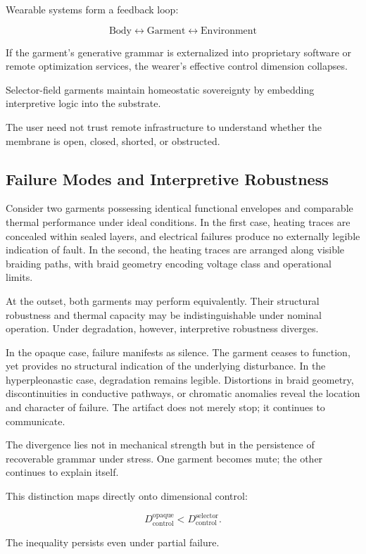 \documentclass[11pt]{article}
\begin{document}
Wearable systems form a feedback loop:

\[
\text{Body} \leftrightarrow \text{Garment} \leftrightarrow \text{Environment}
\]

If the garment's generative grammar is externalized into proprietary 
software or remote optimization services, the wearer's effective 
control dimension collapses.

Selector-field garments maintain homeostatic sovereignty by 
embedding interpretive logic into the substrate.

The user need not trust remote infrastructure to understand 
whether the membrane is open, closed, shorted, or obstructed.

\subsection{Failure Modes and Interpretive Robustness}

Consider two garments possessing identical functional envelopes and
comparable thermal performance under ideal conditions. In the first
case, heating traces are concealed within sealed layers, and electrical
failures produce no externally legible indication of fault. In the
second, the heating traces are arranged along visible braiding paths,
with braid geometry encoding voltage class and operational limits.

At the outset, both garments may perform equivalently. Their structural
robustness and thermal capacity may be indistinguishable under nominal
operation. Under degradation, however, interpretive robustness diverges.

In the opaque case, failure manifests as silence. The garment ceases to
function, yet provides no structural indication of the underlying
disturbance. In the hyperpleonastic case, degradation remains legible.
Distortions in braid geometry, discontinuities in conductive pathways,
or chromatic anomalies reveal the location and character of failure.
The artifact does not merely stop; it continues to communicate.

The divergence lies not in mechanical strength but in the persistence
of recoverable grammar under stress. One garment becomes mute; the
other continues to explain itself.

This distinction maps directly onto dimensional control:

\[
D_{\text{control}}^{\text{opaque}} < D_{\text{control}}^{\text{selector}}.
\]

The inequality persists even under partial failure.
\end{document}
